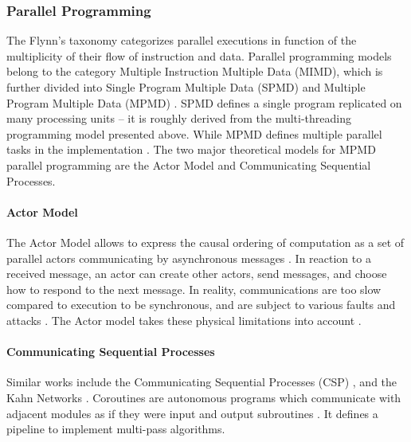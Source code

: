\subsubsection{Parallel Programming} \label{chapter3:software-efficiency:concurrency:parallel-programming}

The Flynn's taxonomy \cite{Flynn1972} categorizes parallel executions in function of the multiplicity of their flow of instruction and data.
Parallel programming models belong to the category Multiple Instruction Multiple Data (MIMD), which is further divided into Single Program Multiple Data (SPMD) \cite{Auguin1983,Darema1988,Darema2001} and Multiple Program Multiple Data (MPMD) \cite{Chang1997,Chan2004}.
SPMD defines a single program replicated on many processing units \cite{Culler,Johnson1995,K.ManiChandy2005} -- it is roughly derived from the multi-threading programming model presented above.
While MPMD defines multiple parallel tasks in the implementation \cite{Grimshaw1991,Foster1995b,Foster1996}.
The two major theoretical models for MPMD parallel programming are the Actor Model and Communicating Sequential Processes.


\paragraph{Actor Model}

The Actor Model allows to express the causal ordering of computation as a set of parallel actors communicating by asynchronous messages \cite{Hewitt1973a, Hewitt1977, Clinger1981}.
In reaction to a received message, an actor can create other actors, send messages, and choose how to respond to the next message.
In reality, communications are too slow compared to execution to be synchronous, and are subject to various faults and attacks \cite{Lamport1982}.
The Actor model takes these physical limitations into account \cite{Hewitt1977a}.
\paragraph{Communicating Sequential Processes}

Similar works include the Communicating Sequential Processes (CSP) \cite{Hoare1978, Brookes1984}, and the Kahn Networks \cite{Kahn1974, Kahn1976}.
Coroutines are autonomous programs which communicate with adjacent modules as if they were input and output subroutines \cite{Conway1963}.
It defines a pipeline to implement multi-pass algorithms.


